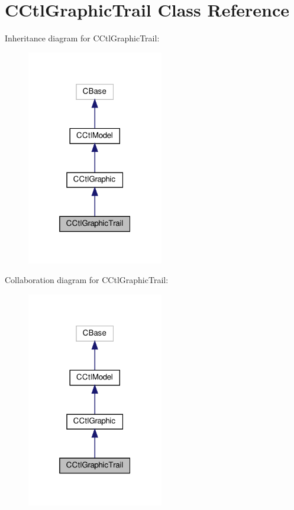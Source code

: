 \hypertarget{classCCtlGraphicTrail}{}\section{C\+Ctl\+Graphic\+Trail Class Reference}
\label{classCCtlGraphicTrail}


Inheritance diagram for C\+Ctl\+Graphic\+Trail\+:
\nopagebreak
\begin{figure}[H]
\begin{center}
\leavevmode
\includegraphics[width=169pt]{classCCtlGraphicTrail__inherit__graph}
\end{center}
\end{figure}


Collaboration diagram for C\+Ctl\+Graphic\+Trail\+:
\nopagebreak
\begin{figure}[H]
\begin{center}
\leavevmode
\includegraphics[width=169pt]{classCCtlGraphicTrail__coll__graph}
\end{center}
\end{figure}
